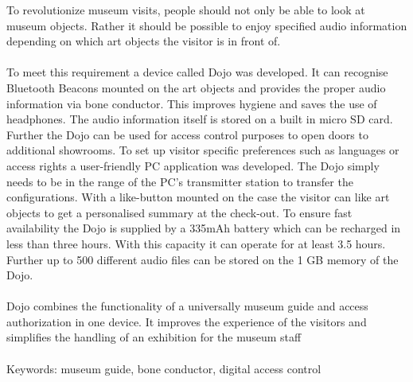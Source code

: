 To revolutionize museum visits, people should not only be able to look at museum objects. Rather it should be possible to enjoy specified audio information depending on which art objects the visitor is in front of.\\\\ To meet this requirement a device called Dojo was developed. It can recognise Bluetooth Beacons mounted on the art objects and provides the proper audio information via bone conductor. This improves hygiene and saves the use of headphones. The audio information itself is stored on a built in micro SD card. Further the Dojo can be used for access control purposes to open doors to additional showrooms. To set up visitor specific preferences such as languages or access rights a user-friendly PC application was developed. The Dojo simply needs to be in the range of the PC's transmitter station to transfer the configurations. With a like-button mounted on the case the visitor can like art objects to get a personalised summary at the check-out. To ensure fast availability the Dojo is supplied by a 335mAh battery which can be recharged in less than three hours. With this capacity it can operate for at least 3.5 hours. Further up to 500 different audio files can be stored on the 1 GB memory of the Dojo.\\\\ Dojo combines the functionality of a universally museum guide and access authorization in one device. It improves the experience of the visitors and simplifies the handling of an exhibition for the museum staff\\\\Keywords: museum guide, bone conductor, digital access control

